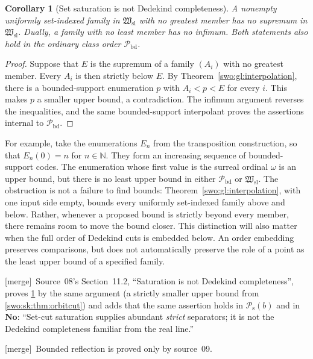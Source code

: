 \documentclass[11pt]{article}
\newtheorem{corollary}[corollary]{Corollary}
\theoremstyle{definition}
\theoremstyle{remark}
\newcommand{\No}{\mathbf{No}}
\newcommand{\Hsl}{\mathfrak W_{\mathrm{sl}}}
\newcommand{\Pbd}{\mathcal P_{\mathrm{bd}}}
\newcommand{\Psupp}{\mathcal P_{\mathrm{s}}}
\newcommand{\merge}{\textsf{[merge]}}
\begin{document}
\begin{corollary}[Set saturation is not Dedekind completeness]
\label{swo:gl:no-suprema}
A nonempty uniformly set-indexed family in $\Hsl$ with no greatest member
has no supremum in $\Hsl$.  Dually, a family with no least member has no
infimum.  Both statements also hold in the ordinary class order $\Pbd$.
\end{corollary}

\begin{proof}
Suppose that $E$ is the supremum of a family $(A_i)$ with no greatest member.
Every $A_i$ is then strictly below $E$.  By
Theorem~\ref{swo:gl:interpolation}, there is a bounded-support enumeration $p$
with $A_i<p<E$ for every $i$.  This makes $p$ a smaller upper bound, a
contradiction.  The infimum argument reverses the inequalities, and the same
bounded-support interpolant proves the assertions internal to $\Pbd$.
\end{proof}

For example, take the enumerations $E_n$ from the transposition construction,
so that $E_n(0)=n$ for $n\in\mathbb N$.  They form an increasing sequence
of bounded-support codes.  The enumeration whose first value is the surreal
ordinal $\omega$ is an upper bound, but there is no least upper bound in
either $\Pbd$ or $\Hsl$.  The obstruction is not a failure to find bounds:
Theorem~\ref{swo:gl:interpolation}, with one input side empty, bounds every
uniformly set-indexed family above and below.  Rather, whenever a proposed
bound is strictly beyond every member, there remains room to move the bound
closer.  This distinction will also matter when the full order of Dedekind
cuts is embedded below.  An order embedding preserves comparisons, but does
not automatically preserve the role of a point as the least upper bound of
a specified family.


\merge\ Source~08's Section~11.2, ``Saturation is not Dedekind completeness'',
proves \cref{swo:gl:no-suprema} by the same argument (a strictly smaller upper
bound from \cref{swo:sk:thm:orbitcut}) and adds that the same assertion holds
in $\Psupp(b)$ and in $\No$: ``Set-cut saturation supplies abundant
\emph{strict} separators; it is not the Dedekind completeness familiar from the
real line.''


\merge\ Bounded reflection is proved only by source~09.
\end{document}

